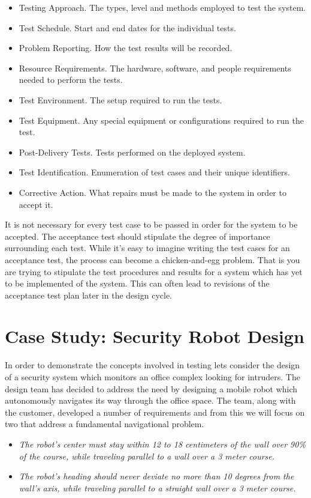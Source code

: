 \begin{itemize}
\item
  Testing Approach. The types, level and methods employed to test the
  system.
\item
  Test Schedule. Start and end dates for the individual tests.
\item
  Problem Reporting. How the test results will be recorded.
\item
  Resource Requirements. The hardware, software, and people requirements
  needed to perform the tests.
\item
  Test Environment. The setup required to run the tests.
\item
  Test Equipment. Any special equipment or configurations required to
  run the test.
\item
  Post-Delivery Tests. Tests performed on the deployed system.
\item
  Test Identification. Enumeration of test cases and their unique
  identifiers.
\item
  Corrective Action. What repairs must be made to the system in order to
  accept it.
\end{itemize}

It is not necessary for every test case to be passed in order for the
system to be accepted. The acceptance test should stipulate the degree
of importance surrounding each test. While it's easy to imagine writing
the test cases for an acceptance test, the process can become a
chicken-and-egg problem. That is you are trying to stipulate the test
procedures and results for a system which has yet to be implemented of
the system. This can often lead to revisions of the acceptance test plan
later in the design cycle.

\section{Case Study: Security Robot Design}
\label{section:case-study-security-robot-design}

In order to demonstrate the concepts involved in testing lets consider
the design of a security system which monitors an office complex looking
for intruders. The design team has decided to address the need by
designing a mobile robot which autonomously navigates its way through
the office space. The team, along with the customer, developed a number
of requirements and from this we will focus on two that address a
fundamental navigational problem.

\begin{itemize}
\item
  \emph{The robot's center must stay within 12 to 18 centimeters of the
  wall over 90\% of the course, while traveling parallel to a wall over
  a 3 meter course.}
\item
  \emph{The robot's heading should never deviate no more than 10 degrees
  from the wall's axis, while traveling parallel to a straight wall over
  a 3 meter course.}
\end{itemize}

